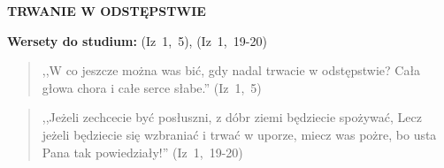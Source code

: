 \documentclass[10pt,a4paper,oneside]{article}
\begin{document}
\centerline{\textbf{\MakeUppercase{Trwanie w odstępstwie}}}
\begin{center}
\textbf{Wersety do studium:} \mbox{(Iz 1, 5)}, \mbox{(Iz 1, 19-20)}
\end{center}
\begin{quote}
,,W co jeszcze można was bić, gdy nadal trwacie w odstępstwie? Cała głowa chora i całe serce słabe.'' \mbox{(Iz 1, 5)}
\end{quote}
\begin{quote}
,,Jeżeli zechcecie być posłuszni, z dóbr ziemi będziecie spożywać, Lecz jeżeli będziecie się wzbraniać i trwać w uporze, miecz was pożre, bo usta Pana tak powiedziały!'' \mbox{(Iz 1, 19-20)}
\end{quote}
\end{document}
